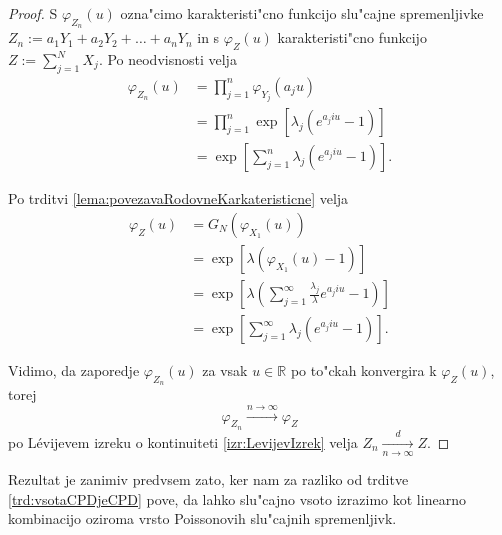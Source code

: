 \documentclass[12pt, a4paper, reqno]{amsart}
\theoremstyle{definition}
\theoremstyle{plain}
\newcommand{\R}{\mathbb{R}}
\newcommand{\1}{\mathds{1}}
\newcommand*{\refPriloga}[1]{%
  \begingroup
    \hypersetup{
      linkcolor=red,
      linkbordercolor=red,
    }%
    \ref{#1}%
  \endgroup
}
\begin{document}
    \begin{proof}
        S $\varphi_{Z_n}(u)$ ozna"cimo karakteristi"cno funkcijo slu"cajne spremenljivke 
        $Z_n := a_1Y_1 + a_2Y_2 + \dots + a_nY_n$ in s $\varphi_{Z}(u)$ karakteristi"cno funkcijo
        $Z:= \sum_{j=1}^{N}X_j$. Po neodvisnosti velja
        \begin{align*}
            \varphi_{Z_n}(u) 
                    &= \prod_{j=1}^{n}\varphi_{Y_j}(a_ju)\\
                    &= \prod_{j=1}^{n}\exp\left[\lambda_j\left(e^{a_j i u} - 1\right)\right] \\
                    &= \exp\left[\sum_{j=1}^{n}\lambda_j\left(e^{a_j i u} - 1\right)\right].
        \end{align*}

        \noindent
        Po trditvi  \ref{lema:povezavaRodovneKarkateristicne} velja
        \begin{align*}
            \varphi_{Z}(u) 
                    &= G_N\left(\varphi_{X_1}(u)\right) \\
                    &= \exp\left[\lambda\left(\varphi_{X_1}(u) - 1\right)\right] \\
                    & = \exp\left[\lambda\left(\sum_{j=1}^\infty\frac{\lambda_j}{\lambda}e^{a_jiu} - 1\right)\right]\\
                    &= \exp\left[\sum_{j=1}^{\infty}\lambda_j\left(e^{a_j i u} - 1\right)\right].
        \end{align*}

        \noindent 
        Vidimo, da zaporedje $\varphi_{Z_n}(u)$ za vsak $u\in\R$ po to"ckah konvergira k $\varphi_{Z}(u)$, torej
        \begin{equation*}
            \varphi_{Z_n} \xrightarrow{n\to\infty}\varphi_Z
        \end{equation*}
        po Lévijevem izreku o kontinuiteti \refPriloga{izr:LevijevIzrek} velja $Z_n \xrightarrow[n\to\infty]{d}Z$.
    \end{proof}

    Rezultat je zanimiv predvsem zato, ker nam za razliko od trditve \ref{trd:vsotaCPDjeCPD} pove, da 
    lahko slu"cajno vsoto izrazimo kot linearno kombinacijo oziroma vrsto Poissonovih slu"cajnih spremenljivk.
\end{document}
